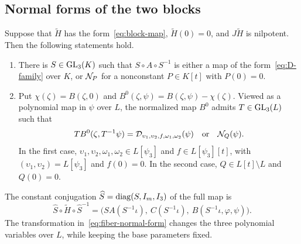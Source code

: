 \subsection{Normal forms of the two blocks}
\begin{theorem}\label{thm2}
Suppose that $\widetilde H$ has the form~\eqref{eq:block-map}, $\widetilde H(0)=0$, and $J\widetilde H$ is nilpotent. Then the following statements hold.
\begin{enumerate}
\item There is $S\in\operatorname{GL}_3(K)$ such that $S\circ A\circ S^{-1}$ is either a map of the form~\eqref{eq:D-family} over $K$, or $\mathcal N_P$ for a nonconstant $P\in K[t]$ with $P(0)=0$.
\item Put $\chi(\zeta)=B(\zeta,0)$ and $B^0(\zeta,\psi)=B(\zeta,\psi)-\chi(\zeta)$. Viewed as a polynomial map in $\psi$ over $L$, the normalized map $B^0$ admits $T\in\operatorname{GL}_3(L)$ such that
\begin{equation}\label{eq:fiber-normal-form}
 T B^0(\zeta,T^{-1}\psi)=\mathcal D_{\upsilon_1,\upsilon_2,f,\omega_1,\omega_2}(\psi)
 \quad\text{or}\quad \mathcal N_Q(\psi).
\end{equation}
In the first case, $\upsilon_1,\upsilon_2,\omega_1,\omega_2\in L[\psi_3]$ and $f\in L[\psi_3][t]$, with $(\upsilon_1,\upsilon_2)=L[\psi_3]$ and $f(0)=0$. In the second case, $Q\in L[t]\setminus L$ and $Q(0)=0$.
\end{enumerate}
The constant conjugation $\widehat S=\operatorname{diag}(S,I_m,I_3)$ of the full map is
\begin{equation}\label{eq:whole-base-conjugation}
 \widehat S\circ\widetilde H\circ\widehat S^{-1}
 =\bigl(SA(S^{-1}\iota),\ C(S^{-1}\iota),\ B(S^{-1}\iota,\varphi,\psi)\bigr).
\end{equation}
The transformation in~\eqref{eq:fiber-normal-form} changes the three polynomial variables over $L$, while keeping the base parameters fixed.
\end{theorem}

